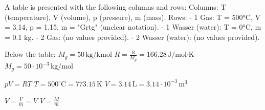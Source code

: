 A table is presented with the following columns and rows:  
Columns: T (temperature), V (volume), p (pressure), m (mass).  
Rows:  
- 1 Gas: T = 500°C, V = 3.14, p = 1.15, m = "Grtg" (unclear notation).  
- 1 Wasser (water): T = 0°C, m = 0.1 kg.  
- 2 Gas: (no values provided).  
- 2 Wasser (water): (no values provided).  

Below the table:  
\( M_g = 50 \, \text{kg/kmol} \)  
\( R = \frac{\bar{R}}{M_g} = 166.28 \, \text{J/mol·K} \)  
\( M_g = 50 \cdot 10^{-3} \, \text{kg/mol} \)  

\( pV = RT \)  
\( T = 500^\circ \text{C} = 773.15 \, \text{K} \)  
\( V = 3.14 \, \text{L} = 3.14 \cdot 10^{-3} \, \text{m}^3 \)  

\( V = \frac{V}{m} = V \)  
\( V = \frac{M}{m} \)